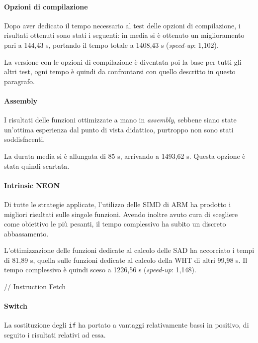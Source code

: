 \paragraph{Opzioni di compilazione \\}
  Dopo aver dedicato il tempo necessario al test delle opzioni di compilazione, 
  i risultati ottenuti sono stati i seguenti: in media si è ottenuto un 
  miglioramento pari a 144,43 s, portando il tempo totale a 1408,43 s 
  (\textit{speed-up}: 1,102).
  
  La versione con le opzioni di compilazione è diventata poi la base per tutti 
  gli altri test, ogni tempo è quindi da confrontarsi con quello descritto in 
  questo paragrafo.
  
\paragraph{Assembly \\}
  I risultati delle funzioni ottimizzate a mano in \emph{assembly}, sebbene 
  siano state un'ottima esperienza dal punto di vista didattico, purtroppo non 
  sono stati soddisfacenti. 
  
  La durata media si è allungata di 85 s, arrivando a 1493,62 s. Questa opzione 
  è stata quindi scartata.
  
\paragraph{Intrinsic NEON \\}
  Di tutte le strategie applicate, l'utilizzo delle SIMD di ARM ha prodotto i 
  migliori risultati sulle singole funzioni. Avendo inoltre avuto cura di 
  scegliere come obiettivo le più pesanti, il tempo complessivo ha subito un 
  discreto abbassamento.
  
  L'ottimizzazione delle funzioni dedicate al calcolo delle SAD ha accorciato i 
  tempi di 81,89 s, quella sulle funzioni dedicate al calcolo della WHT di 
  altri 99,98 s. Il tempo complessivo è quindi sceso a 1226,56 s 
  (\textit{speed-up}: 1,148).
  
  // Instruction Fetch
  
\paragraph{Switch \\}
  La sostituzione degli \verb|if| ha portato a vantaggi relativamente bassi in 
  positivo, di seguito i risultati relativi ad essa.
  
